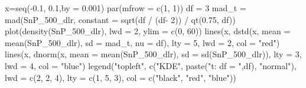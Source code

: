 \documentclass[
  letterpaper,
  DIV=11,
  numbers=noendperiod]{scrartcl}
\newenvironment{Shaded}{\begin{snugshade}}{\end{snugshade}}
\newcommand{\AttributeTok}[1]{\textcolor[rgb]{0.40,0.45,0.13}{#1}}
\newcommand{\DecValTok}[1]{\textcolor[rgb]{0.68,0.00,0.00}{#1}}
\newcommand{\FloatTok}[1]{\textcolor[rgb]{0.68,0.00,0.00}{#1}}
\newcommand{\FunctionTok}[1]{\textcolor[rgb]{0.28,0.35,0.67}{#1}}
\newcommand{\NormalTok}[1]{\textcolor[rgb]{0.00,0.23,0.31}{#1}}
\newcommand{\OtherTok}[1]{\textcolor[rgb]{0.00,0.23,0.31}{#1}}
\newcommand{\SpecialCharTok}[1]{\textcolor[rgb]{0.37,0.37,0.37}{#1}}
\newcommand{\StringTok}[1]{\textcolor[rgb]{0.13,0.47,0.30}{#1}}
\begin{document}
\begin{Shaded}
\begin{Highlighting}[]
\NormalTok{x}\OtherTok{=}\FunctionTok{seq}\NormalTok{(}\SpecialCharTok{{-}}\FloatTok{0.1}\NormalTok{, }\FloatTok{0.1}\NormalTok{,}\AttributeTok{by =} \FloatTok{0.001}\NormalTok{)}
\FunctionTok{par}\NormalTok{(}\AttributeTok{mfrow =} \FunctionTok{c}\NormalTok{(}\DecValTok{1}\NormalTok{, }\DecValTok{1}\NormalTok{))}
\NormalTok{df }\OtherTok{=} \DecValTok{3}
\NormalTok{mad\_t }\OtherTok{=} \FunctionTok{mad}\NormalTok{(SnP\_500\_dlr, }
            \AttributeTok{constant =} \FunctionTok{sqrt}\NormalTok{(df }\SpecialCharTok{/}\NormalTok{ (df}\SpecialCharTok{{-}} \DecValTok{2}\NormalTok{)) }\SpecialCharTok{/} \FunctionTok{qt}\NormalTok{(}\FloatTok{0.75}\NormalTok{, df))}
\FunctionTok{plot}\NormalTok{(}\FunctionTok{density}\NormalTok{(SnP\_500\_dlr), }\AttributeTok{lwd =} \DecValTok{2}\NormalTok{, }\AttributeTok{ylim =} \FunctionTok{c}\NormalTok{(}\DecValTok{0}\NormalTok{, }\DecValTok{60}\NormalTok{))}
\FunctionTok{lines}\NormalTok{(x, }\FunctionTok{dstd}\NormalTok{(x, }\AttributeTok{mean =} \FunctionTok{mean}\NormalTok{(SnP\_500\_dlr), }\AttributeTok{sd =}\NormalTok{ mad\_t, }\AttributeTok{nu =}\NormalTok{ df),}
 \AttributeTok{lty =} \DecValTok{5}\NormalTok{, }\AttributeTok{lwd =} \DecValTok{2}\NormalTok{, }\AttributeTok{col =} \StringTok{"red"}\NormalTok{)}
\FunctionTok{lines}\NormalTok{(x, }\FunctionTok{dnorm}\NormalTok{(x, }\AttributeTok{mean =} \FunctionTok{mean}\NormalTok{(SnP\_500\_dlr), }\AttributeTok{sd =} \FunctionTok{sd}\NormalTok{(SnP\_500\_dlr)),}
 \AttributeTok{lty =} \DecValTok{3}\NormalTok{, }\AttributeTok{lwd =} \DecValTok{4}\NormalTok{, }\AttributeTok{col =} \StringTok{"blue"}\NormalTok{)}
\FunctionTok{legend}\NormalTok{(}\StringTok{"topleft"}\NormalTok{, }\FunctionTok{c}\NormalTok{(}\StringTok{"KDE"}\NormalTok{, }\FunctionTok{paste}\NormalTok{(}\StringTok{"t: df = "}\NormalTok{,df), }\StringTok{"normal"}\NormalTok{),}
 \AttributeTok{lwd =} \FunctionTok{c}\NormalTok{(}\DecValTok{2}\NormalTok{, }\DecValTok{2}\NormalTok{, }\DecValTok{4}\NormalTok{), }\AttributeTok{lty =} \FunctionTok{c}\NormalTok{(}\DecValTok{1}\NormalTok{, }\DecValTok{5}\NormalTok{, }\DecValTok{3}\NormalTok{),}
 \AttributeTok{col =} \FunctionTok{c}\NormalTok{(}\StringTok{"black"}\NormalTok{, }\StringTok{"red"}\NormalTok{, }\StringTok{"blue"}\NormalTok{))}
\end{Highlighting}
\end{Shaded}
\end{document}
